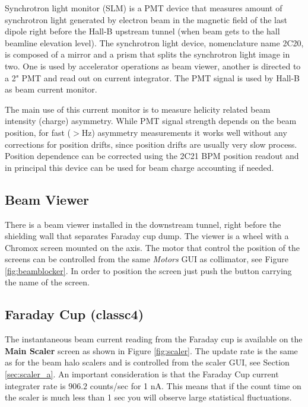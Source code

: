 \documentclass[12pt]{article}
\begin{document}
Synchrotron light monitor (SLM) is a PMT device that measures amount of synchrotron light generated by electron beam in the magnetic field of the last dipole right before the Hall-B upstream tunnel (when beam gets to the hall beamline elevation level). The synchrotron light device, nomenclature name 2C20, is composed of a mirror and a prism that splits the synchrotron light image in two. One is used by accelerator operations as beam viewer, another is directed to a 2" PMT and read out  on current integrator. The PMT signal is used by Hall-B as beam current monitor.   

The main use of this current monitor is to measure helicity related beam intensity (charge) asymmetry. While PMT signal strength depends on the beam position, for fast ($>$Hz) asymmetry measurements it works well without any corrections for position drifts, since position drifts are usually very slow process. Position dependence can be corrected using the 2C21 BPM position readout and in principal this device can be used for beam charge accounting if needed.    

\subsection{Beam Viewer \label{sec:view}}
\indent

There is a beam viewer installed in the downstream tunnel, right before the shielding wall that separates Faraday cup dump. The viewer is a wheel with a Chromox screen mounted on the axis. The motor that control the position of the screens can be controlled from the same {\it Motors} GUI as collimator, see Figure \ref{fig:beamblocker}. In order to position the screen just push the button carrying the name of the screen.  

\subsection{Faraday Cup (classc4) \label{sec:fcup}}
\indent

The instantaneous beam current reading from the Faraday cup is available on
the \textbf{Main Scaler} screen as shown in Figure \ref{fig:scaler}. The update rate is the same as for the beam halo scalers and
is controlled from the scaler GUI, see Section \ref{sec:scaler_a}. An important consideration
is that the Faraday Cup current integrater rate is $906.2$ counts/sec for 1 nA. This means that if the count time on the scaler is much less than 1 sec
you will observe large statistical fluctuations.
\end{document}
